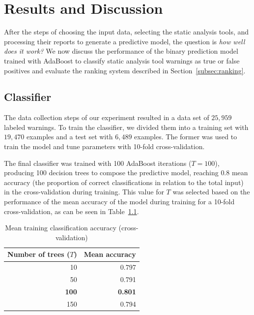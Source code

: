 \chapter{Results and Discussion}
\label{cha:results}
\FloatBarrier

After the steps of choosing the input data, selecting the static analysis
tools, and processing their reports to generate a predictive model, the question is \emph{how well does
it work?} We now
discuss the performance of the binary prediction model trained with
AdaBoost to classify static analysis tool warnings as true or false positives and
evaluate the ranking system described in Section~\ref{subsec:ranking}.

\section{Classifier}
\label{sec:results_classifier}

The data collection steps of our experiment resulted in a data set of $25,959$ labeled
warnings. To train the classifier, we divided them
into a training set with $19,470$ examples and a test set with $6,489$
examples. The former was used to train the model and tune parameters with 
10-fold cross-validation.

The final classifier was trained with 100 AdaBoost iterations ($T = 100$),
producing 100 decision trees to compose the predictive model, reaching $0.8$
mean accuracy (the proportion of correct classifications in relation to the total input)
in the cross-validation during training. This value for $T$ was
selected based on the performance of the mean accuracy of the model during training for a 10-fold
cross-validation, as can be seen in Table~\ref{tab:mean_acc}.

  \begin{table}
    \begin{center}
        \begin{tabular}{rr}\hline
          Number of trees ($T$) & Mean accuracy \\
        \hline
          10 & 0.797 \\
          50 & 0.791 \\
          \textbf{100} & \textbf{0.801} \\
          150 & 0.794 \\ \hline
        \end{tabular}
        \caption{Mean training classification accuracy (cross-validation)}\label{tab:mean_acc}
    \end{center}
\end{table}

